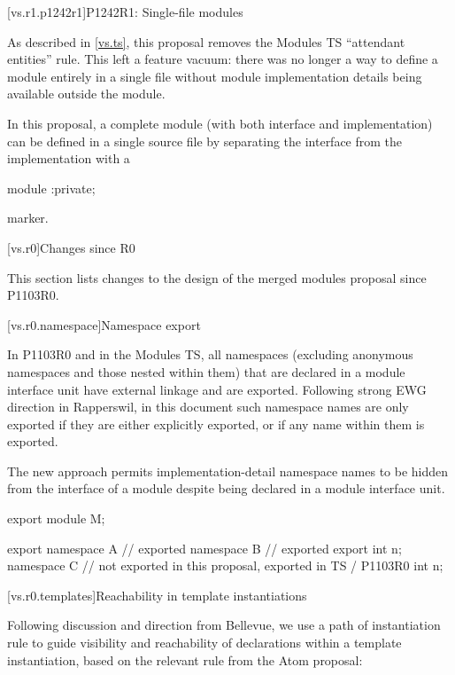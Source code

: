 [vs.r1.p1242r1]{P1242R1: Single-file modules}

\pnum
As described in \ref{vs.ts}, this proposal removes the
Modules TS ``attendant entities'' rule.
This left a feature vacuum:
there was no longer a way to define a module entirely in a single file
without module implementation details being available outside the module.

\pnum
In this proposal, a complete module
(with both interface and implementation)
can be defined in a single source file
by separating the interface from the implementation
with a
\begin{codeblock}
module :private;
\end{codeblock}
marker.

[vs.r0]{Changes since R0}

\pnum
This section lists changes to the design of the merged modules proposal
since P1103R0.

[vs.r0.namespace]{Namespace export}

\pnum
In P1103R0 and in the Modules TS,
all namespaces
(excluding anonymous namespaces and those nested within them)
that are declared in a module interface unit
have external linkage and
are exported.
Following strong EWG direction in Rapperswil,
in this document such namespace names
are only exported if they are either
explicitly exported, or
if any name within them is exported.
\begin{note}
The new approach permits implementation-detail namespace names
to be hidden from the interface of a module
despite being declared in a module interface unit.
\end{note}
\begin{example}
\begin{codeblock}
export module M;

export namespace A {} // exported
namespace B {         // exported
  export int n;
}
namespace C {         // not exported in this proposal, exported in TS / P1103R0
  int n;
}
\end{codeblock}
\end{example}

[vs.r0.templates]{Reachability in template instantiations}

\pnum
Following discussion and direction from Bellevue,
we use a path of instantiation rule to guide
visibility and reachability of declarations
within a template instantiation, based on
the relevant rule from the Atom proposal:

